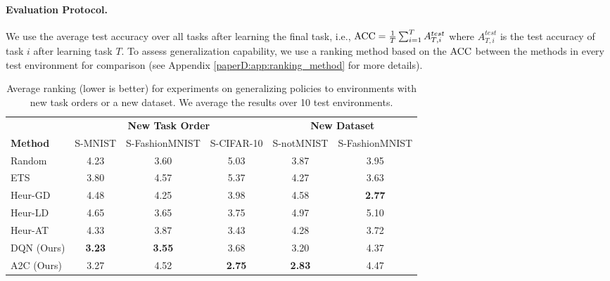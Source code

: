 \vspace{-3mm}
\paragraph{Evaluation Protocol.} We use the average test accuracy over all tasks after learning the final task, i.e., ${\text{ACC}} = \frac{1}{T} \sum_{i=1}^{T} A_{T, i}^{test}$ where $A_{T, i}^{test}$ is the test accuracy of task $i$ after learning task $T$. 
To assess generalization capability, we use a ranking method based on the ${\text{ACC}}$ between the methods in every test environment for comparison (see Appendix \ref{paperD:app:ranking_method} for more details). 



\begin{table}[t]
	\footnotesize%
	\centering
	\caption{Average ranking (lower is better) for experiments on generalizing policies to environments with new task orders or a new dataset. %
		We average the results over 10 test environments. %
	}
	\label{tab:average_ranking_rl_experiment}
		\begin{tabular}{l c c c c c}
			\toprule %
			& \multicolumn{3}{c}{ {\bf New Task Order}} & \multicolumn{2}{c}{ {\bf New Dataset}}\\
			\cmidrule(lr){2-4}  \cmidrule(lr){5-6}
			{\bf Method} & S-MNIST & S-FashionMNIST & S-CIFAR-10 & S-notMNIST & S-FashionMNIST  \\ 
			\midrule
			Random         & 4.23   & 3.60 & 5.03 & 3.87 & 3.95\\ 
			ETS            & 3.80 & 4.57 & 5.37 & 4.27 & 3.63 \\
			\midrule 
			Heur-GD        & 4.48 & 4.25 & 3.98 & 4.58 & {\bf 2.77} \\
			Heur-LD        & 4.65 & 3.65 & 3.75 & 4.97 & 5.10 \\
			Heur-AT        & 4.33 & 3.87 & 3.43 & 4.28 & 3.72 \\
			\midrule
			DQN (Ours)     & {\bf 3.23} & {\bf 3.55} & 3.68 & 3.20 & 4.37 \\
			A2C (Ours)     & 3.27 & 4.52 & {\bf 2.75} & {\bf 2.83} & 4.47 \\
			\bottomrule %
		\end{tabular}
	\vspace{-2mm}
\end{table}


